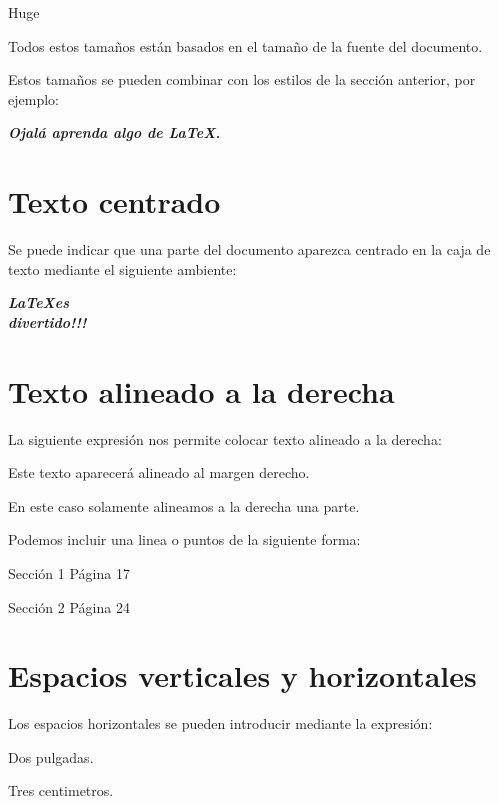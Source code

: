 \documentclass[letterpaper,12pt]{report}
\begin{document}
{\Huge Huge}

Todos estos tamaños están basados en el tamaño de la fuente del documento.

Estos tamaños se pueden combinar con los estilos de la sección anterior, por ejemplo:

\begin{Large}
\textbf{\textit{Ojalá aprenda algo de \LaTeX.}}
\end{Large}

\chapter{Texto centrado}

Se puede indicar que una parte del documento aparezca centrado en la caja de texto mediante el siguiente ambiente:

\begin{center}
\LARGE{\textbf{\textit{\LaTeX es \\ divertido!!!}}}
\end{center}

\chapter{Texto alineado a la derecha}

La siguiente expresión nos permite colocar texto alineado a la derecha:

\hfill Este texto aparecerá alineado al margen derecho.

En este caso solamente alineamos a la derecha \hfill una parte.

Podemos incluir una linea o puntos de la siguiente forma:

Sección 1 \hrulefill Página 17

Sección 2 \dotfill Página 24

\chapter{Espacios verticales y horizontales}

Los espacios horizontales se pueden introducir mediante la expresión:

\hspace{2in}Dos pulgadas.

\hspace{3cm}Tres centimetros.
\hspace{3.5cm}
\end{document}
